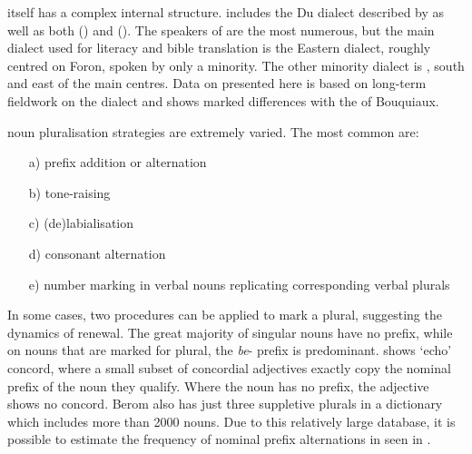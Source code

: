 \documentclass[output=paper]{langsci/langscibook}
\begin{document}
 itself has a complex internal structure.  includes the Du dialect described by \citet{Bouquiaux1970,Bouquiaux2001} as well as both  () and  (). The speakers of  are the most numerous, but the main dia\-lect used for literacy and bible translation is the Eastern dialect, roughly centred on Foron, spoken by only a minority. The other minority dialect is , south and east of the main centres. Data on  presented here is based on long-term fieldwork on the  dialect and shows marked differences with the  of Bouquiaux.

 noun pluralisation strategies are extremely varied. The most common are:

\begin{itemize}
 \item[a)] prefix addition or alternation
 \item[b)] tone-raising
 \item[c)]  (de)labialisation
 \item[d)] consonant alternation
 \item[e)]  number marking in verbal nouns replicating corresponding verbal plurals
\end{itemize}

In some cases, two procedures can be applied to mark a plural, suggesting the dynamics of renewal. The great majority of  singular nouns have no prefix, while on nouns that are marked for plural, the \textit{be}- prefix is predominant.  shows ‘echo’ concord, where a small subset of concordial adjectives exactly copy the nominal prefix of the noun they qualify. Where the noun has no prefix, the adjective shows no concord. Berom also has just three suppletive plurals in a dictionary which includes more than 2000 nouns. Due to this relatively large database, it is possible to estimate the frequency of nominal prefix alternations in  seen in .
\end{document}
